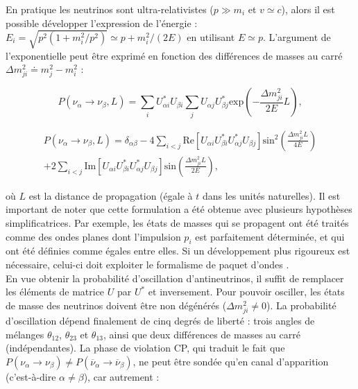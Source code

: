 \bigbreak

En pratique les neutrinos sont ultra-relativistes ($p \gg m_i$ et $v \simeq c$), alors il est possible développer l'expression de l'énergie : $E_i = \sqrt{p^2 (1 + m_i^2/p^2)} \simeq p + m_i^2/(2E)$ en utilisant $E \simeq p$. L'argument de l'exponentielle peut être exprimé en fonction des différences de masses au carré $\Delta m_{ji}^2 \doteq m_j^2 - m_i^2$ :

\begin{equation}
    P(\nu_\alpha \rightarrow \nu_\beta, L) = \sum_i U_{\alpha i}^* U_{\beta i} \sum_j U_{\alpha j} U_{\beta j}^* \textrm{exp}\left(-\frac{\Delta m_{ji}^2}{2E} L\right),
\end{equation}

\begin{multline}
\label{eq:general_osc_prob}
    P(\nu_\alpha \rightarrow \nu_\beta, L) = \delta_{\alpha\beta} - 4 \sum_{i < j} \textrm{Re}\left[U_{\alpha i}U_{\beta i}^*U_{\alpha j}^*U_{\beta j} \right]\textrm{sin}^2\left(\frac{\Delta m^2_{ji} L}{4E} \right) \\
    + 2 \sum_{i < j} \textrm{Im}\left[U_{\alpha i}U_{\beta i}^*U_{\alpha j}^*U_{\beta j} \right]\textrm{sin}\left(\frac{\Delta m^2_{ji} L}{2E} \right),
\end{multline}

\bigbreak

où $L$ est la distance de propagation (égale à $t$ dans les unités naturelles). Il est important de noter que cette formulation a été obtenue avec plusieurs hypothèses simplificatrices. Par exemple, les états de masses qui se propagent ont été traités comme des ondes planes dont l'impulsion $p_i$ est parfaitement déterminée, et qui ont été définies comme égales entre elles. Si un développement plus rigoureux est nécessaire, celui-ci doit exploiter le formalisme de paquet d'ondes \cite{Smirnov:2016xzf}.\\

En vue obtenir la probabilité d'oscillation d'antineutrinos, il suffit de remplacer les éléments de matrice $U$ par $U^*$ et inversement. Pour pouvoir osciller, les états de masse des neutrinos doivent être non dégénérés ($\Delta m_{ji}^2 \neq 0$). La probabilité d'oscillation dépend finalement de cinq degrés de liberté : trois angles de mélanges $\theta_{12}$, $\theta_{23}$ et $\theta_{13}$, ainsi que deux différences de masses au carré (indépendantes). La phase de violation CP, qui traduit le fait que $P(\nu_\alpha \rightarrow \nu_\beta) \neq P(\overline{\nu}_\alpha \rightarrow \overline{\nu}_\beta)$, ne peut être sondée qu'en canal d'apparition (c'est-à-dire $\alpha \neq \beta$), car autrement \cite{Barger:1980jm} :

